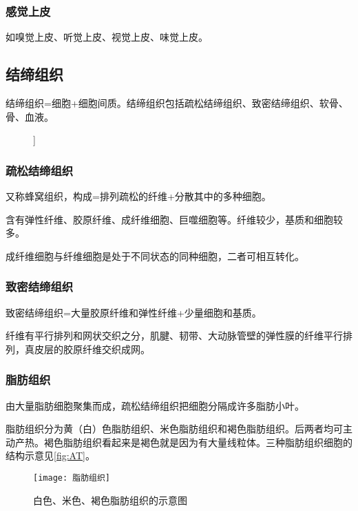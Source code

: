 \subsubsection{感觉上皮}

如嗅觉上皮、听觉上皮、视觉上皮、味觉上皮。

\subsection{结缔组织}

结缔组织=细胞+细胞间质。结缔组织包括疏松结缔组织、致密结缔组织、软骨、骨、血液。
\begin{figure}[h!]
	\centering
	\begin{forest}
		[结缔组织
			[疏松结缔组织]
			[致密结缔组织]
			[软骨]
			[骨]
			[血液]]
	\end{forest}
\end{figure}

\subsubsection{疏松结缔组织}

又称蜂窝组织，构成=排列疏松的纤维+分散其中的多种细胞。

含有弹性纤维、胶原纤维、成纤维细胞、巨噬细胞等。纤维较少，基质和细胞较多。

成纤维细胞与纤维细胞是处于不同状态的同种细胞，二者可相互转化。

\subsubsection{致密结缔组织}

致密结缔组织=大量胶原纤维和弹性纤维+少量细胞和基质。

纤维有平行排列和网状交织之分，肌腱、韧带、大动脉管壁的弹性膜的纤维平行排列，真皮层的胶原纤维交织成网。
\subsubsection{脂肪组织}

由大量脂肪细胞聚集而成，疏松结缔组织把细胞分隔成许多脂肪小叶。

脂肪组织分为黄（白）色脂肪组织、米色脂肪组织和褐色脂肪组织。后两者均可主动产热。褐色脂肪组织看起来是褐色就是因为有大量线粒体。三种脂肪组织细胞的结构示意见\autoref{fig:AT}。

\begin{figure}[h!]
	\centering
	\texttt{[image: 脂肪组织]}
	\caption{白色、米色、褐色脂肪组织的示意图}
	\label{fig:AT}
\end{figure}


